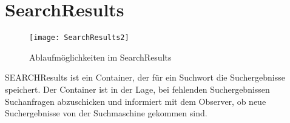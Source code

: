
\section{SearchResults}
\begin{figure}[htb]
  \centering
  \texttt{[image: SearchResults2]}
  \caption{Ablaufmöglichkeiten im SearchResults}
	\label{fig:Ablaufmöglichkeiten im SearchResults}
\end{figure}

SEARCHResults ist ein Container, der für ein Suchwort die Suchergebnisse speichert.
Der Container ist in der Lage, bei fehlenden Suchergebnissen Suchanfragen abzuschicken und informiert mit dem Observer, ob neue Suchergebnisse von der Suchmaschine gekommen sind.
